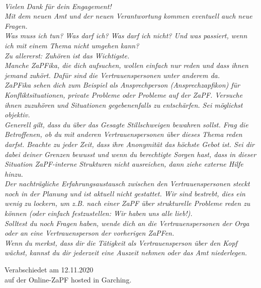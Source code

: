 \documentclass[DIV=calc]{scrartcl}
\begin{document}
\textit{\\
Vielen Dank für dein Engagement!\\
Mit dem neuen Amt und der neuen Verantwortung kommen eventuell auch neue Fragen.\\
Was muss ich tun? Was darf ich? Was darf ich nicht? Und was passiert, wenn ich mit einem Thema nicht umgehen kann?\\
Zu allererst: Zuhören ist das Wichtigste.\\
Manche ZaPFika, die dich aufsuchen, wollen einfach nur reden und dass ihnen jemand zuhört. Dafür sind die Vertrauenspersonen unter anderem da.\\
ZaPFika sehen dich zum Beispiel als Ansprechperson (Ansprechzapfikon) für Konfliktsituationen, private Probleme oder Probleme auf der ZaPF. Versuche ihnen zuzuhören und Situationen gegebenenfalls zu entschärfen. Sei möglichst objektiv.\\
Generell gilt, dass du über das Gesagte Stillschweigen bewahren sollst. Frag die Betroffenen, ob du mit anderen Vertrauenspersonen über dieses Thema reden darfst. Beachte zu jeder Zeit, dass ihre Anonymität das höchste Gebot ist. Sei dir dabei deiner Grenzen bewusst und wenn du berechtigte Sorgen hast, dass in dieser Situation ZaPF-interne Strukturen nicht ausreichen, dann ziehe externe Hilfe hinzu.\\
Der nachträgliche Erfahrungsaustausch zwischen den Vertrauenspersonen steckt noch in der Planung und ist aktuell nicht gestattet. Wir sind bestrebt, dies ein wenig zu lockern, um z.B. nach einer ZaPF über strukturelle Probleme reden zu können (oder einfach festzustellen: Wir haben uns alle lieb!).\\
Solltest du noch Fragen haben, wende dich an die Vertrauenspersonen der Orga oder an eine Vertrauensperson der vorherigen ZaPFen.\\
Wenn du merkst, dass dir die Tätigkeit als Vertrauensperson über den Kopf wächst, kannst du dir jederzeit eine Auszeit nehmen oder das Amt niederlegen.\\
}

    \vfill
    \begin{flushright}
      Verabschiedet am 12.11.2020 \\auf der Online-ZaPF hosted in Garching.
    \end{flushright}
\end{document}
